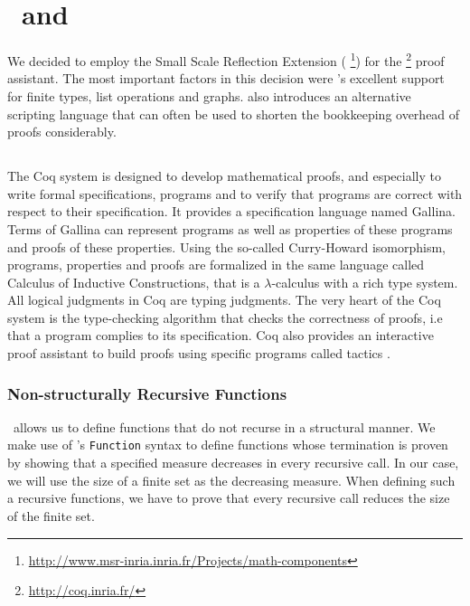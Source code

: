 \chapter{\coq\ and \ssreflect}
\label{chap:coq}


We decided to employ the Small Scale Reflection Extension (\textbf{\ssreflect}%
\footnote{\url{http://www.msr-inria.inria.fr/Projects/math-components}})
for the \textbf{\coq}%
\footnote{\url{http://coq.inria.fr/}}
proof assistant. 
The most important factors in this decision were \ssreflect's excellent support for finite types, list operations and graphs. \ssreflect{} also introduces an alternative scripting language that can often be used to shorten the bookkeeping overhead of proofs considerably.

\section{\coq}

The Coq system is designed to develop mathematical proofs, and especially to write formal specifications, programs and to verify that programs are correct with respect to their specification. 
It provides a specification language named Gallina. 
Terms of Gallina can represent programs as well as properties of these programs and proofs of these properties. 
Using the so-called Curry-Howard isomorphism, programs, properties and proofs are formalized in the same language called Calculus of Inductive Constructions, that is a $\lambda$-calculus with a rich type system. 
All logical judgments in Coq are typing judgments. 
The very heart of the Coq system is the type-checking algorithm that checks the correctness of proofs, i.e that a program complies to its specification. 
Coq also provides an interactive proof assistant to build proofs using specific programs called tactics \cite{Coq:manual}.



\subsection{Non-structurally Recursive Functions}
\coq\ allows us to define functions that do not recurse in a structural manner.
We make use of \coq's \lstinline{Function} syntax to define functions whose termination is proven by 
showing that a specified measure decreases in every recursive call.
In our case, we will use the size of a finite set as the decreasing measure.
When defining such a recursive functions, we have to prove that every recursive call reduces the size of the finite set.


